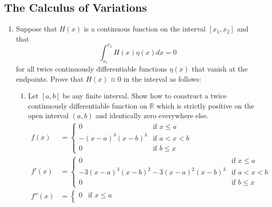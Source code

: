 \documentclass{article}
\begin{document}
\setcounter{subsection}{4}
\subsection{The Calculus of Variations}
\begin{enumerate}
      \item Suppose that $H(x)$ is a continuous function on the interval
            $[x_1, x_2]$ and that
            \begin{equation}
                  \int_{x_1}^{x_2}H(x)\eta (x)dx = 0
                  \label{eq:5.5_e1}
            \end{equation}
            for all twice continuously differentiable functions $\eta (x)$ that
            vanish at the endpoints. Prove that $H(x)\equiv 0$ in the interval
            as follows:
            \begin{enumerate}
                  \item Let $[a,b]$ be any finite interval. Show how to
                        construct a twice continuously differentiable function
                        on $\mathbb{R}$ which is strictly positive on the open
                        interval $(a,b)$ and identically zero everywhere else.
                        \begin{align*}
                              f(x)   & =\begin{cases}
                                    0               & \text{if } x \leq a  \\
                                    -(x-a)^3(x-b)^3 & \text{if } a < x < b \\
                                    0               & \text{if } b \leq x
                              \end{cases}  \\
                              f'(x)  & =\begin{cases}
                                    0                                  & \text{if } x \leq a  \\
                                    -3(x-a)^3(x-b)^2 - 3(x-a)^2(x-b)^3 & \text{if } a < x < b \\
                                    0                                  & \text{if } b \leq x
                              \end{cases}  \\
                              f''(x) & =\begin{cases}
                                    0                          & \text{if } x \leq a \\

\end{cases}
\end{align*}
\end{enumerate}
\end{enumerate}
\end{document}
